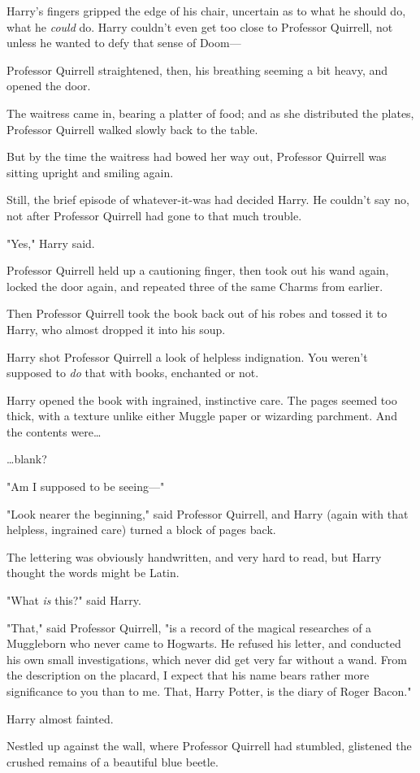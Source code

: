 Harry's fingers gripped the edge of his chair, uncertain as to what he should 
do, what he \emph{could} do. Harry couldn't even get too close to Professor 
Quirrell, not unless he wanted to defy that sense of Doom---

Professor Quirrell straightened, then, his breathing seeming a bit heavy, and 
opened the door.

The waitress came in, bearing a platter of food; and as she distributed the 
plates, Professor Quirrell walked slowly back to the table.

But by the time the waitress had bowed her way out, Professor Quirrell was 
sitting upright and smiling again.

Still, the brief episode of whatever-it-was had decided Harry. He couldn't say 
no, not after Professor Quirrell had gone to that much trouble.

"Yes," Harry said.

Professor Quirrell held up a cautioning finger, then took out his wand again, 
locked the door again, and repeated three of the same Charms from earlier.

Then Professor Quirrell took the book back out of his robes and tossed it to 
Harry, who almost dropped it into his soup.

Harry shot Professor Quirrell a look of helpless indignation. You weren't 
supposed to \emph{do} that with books, enchanted or not.

Harry opened the book with ingrained, instinctive care. The pages seemed too 
thick, with a texture unlike either Muggle paper or wizarding parchment. And 
the contents were{\ldots}

{\ldots}blank?

"Am I supposed to be seeing---"

"Look nearer the beginning," said Professor Quirrell, and Harry (again with 
that helpless, ingrained care) turned a block of pages back.

The lettering was obviously handwritten, and very hard to read, but Harry 
thought the words might be Latin.

"What \emph{is} this?" said Harry.

"That," said Professor Quirrell, "is a record of the magical researches of a 
Muggleborn who never came to Hogwarts. He refused his letter, and conducted his 
own small investigations, which never did get very far without a wand. From the 
description on the placard, I expect that his name bears rather more 
significance to you than to me. That, Harry Potter, is the diary of Roger 
Bacon."

Harry almost fainted.

Nestled up against the wall, where Professor Quirrell had stumbled, glistened 
the crushed remains of a beautiful blue beetle.
